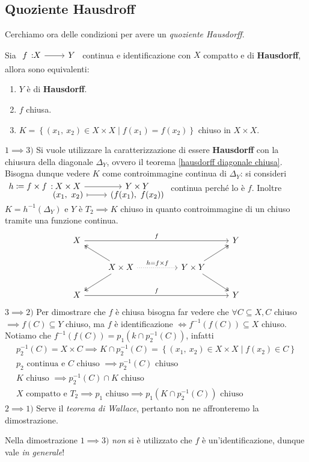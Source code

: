 \subsection{Quoziente Hausdroff}
Cerchiamo ora delle condizioni per avere un \textit{quoziente Hausdorff}.
\begin{theorema}\label{quozientehausdorff}
	Sia $\funz f X Y$ continua e identificazione con $X$ compatto e di \textbf{Hausdorff}, allora sono equivalenti:
		\begin{enumerate}
			\item $Y$ è di \textbf{Hausdorff}.
			\item $f$ chiusa.
			\item $K=\left\{ (x_1,\ x_2)\in X\times X \mid f(x_1)=f(x_2) \right\}$ chiuso in $X\times X$.
		\end{enumerate}
	\vspace{-3mm}
\end{theorema}
\begin{demonstration}
	$1 \implies 3)$  Si vuole utilizzare la caratterizzazione di essere \textbf{Hausdorff} con la chiusura della diagonale $\Delta_Y$, ovvero il teorema \ref{hausdorff diagonale chiusa}. Bisogna dunque vedere $K$ come controimmagine continua di $\Delta_Y$: si consideri	 $\funztot {h\coloneqq f\times f} {X\times X} {Y\times Y} {(x_1,\ x_2)} {\left( f(x_1), \ f(x_2) \right) }$ continua perché lo è $f$. Inoltre $K=h^{-1}(\Delta_Y)$ e $Y$ è $T_2 \implies K$ chiuso in quanto controimmagine di un chiuso tramite una funzione continua.
	\[ 	\begin{tikzcd}
				X \arrow[rrrr, "f"] &                                                                          &  &                                                       & Y \\
				& X\times X \arrow[rr, "h=f\times f" ,dotted] \arrow[lu, two heads] \arrow[ld, two heads] &  & Y\times Y \arrow[ru, two heads] \arrow[rd, two heads] &   \\
				X \arrow[rrrr, "f"] &                                                                          &  &                                                       & Y	
			\end{tikzcd} \]	
	$3\implies 2)$ Per dimostrare che $f$ è chiusa bisogna far vedere che $\forall C\subseteq X, C$ chiuso $\implies f(C)\subseteq Y$ chiuso, ma $f$ è identificazione $\iff f^{-1}\left( f(C) \right)\subseteq X$ chiuso. Notiamo che $f^{-1}\left( f(C) \right)= p_1(k\cap p_2^{-1}(C))$, infatti 
		\begin{gather*}
			p_2^{-1}(C)=X\times C \implies K\cap p_2^{-1}(C)= \left\{ (x_1,\ x_2)\in X\times X \mid f(x_2)\in C \right\}\\
			p_2 \text{ continua e $C$ chiuso } \implies p_2^{-1}(C) \text{ chiuso} \\
			K \text{ chiuso }\implies p_2^{-1}(C)\cap K \text{ chiuso}\\
			X \text{ compatto e } T_2 \implies p_1 \text{ chiuso}\implies p_1 \left( K\cap p_2^{-1}(C) \right) \text{ chiuso}
		\end{gather*}
	$2\implies 1)$ Serve il \textit{teorema di Wallace}, pertanto non ne affronteremo la dimostrazione.
\end{demonstration}
\begin{observe}
	Nella dimostrazione $1\implies 3)$ \textit{non} si è utilizzato che $f$ è un'identificazione, dunque vale \textit{in generale}!
\end{observe}